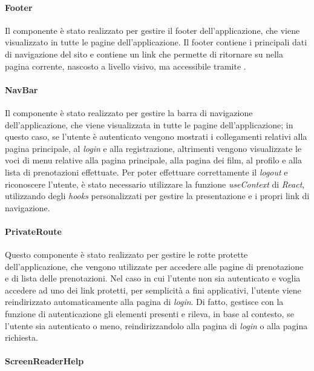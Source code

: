 \paragraph{Footer}\label{par:footer}

Il componente è stato realizzato per gestire il footer dell'applicazione, che viene visualizzato in tutte le pagine dell'applicazione.
Il footer contiene i principali dati di navigazione del sito e contiene un link che permette di ritornare su nella pagina corrente, nascosto a livello visivo, ma accessibile tramite .

\paragraph{NavBar}\label{par:navbar}

Il componente è stato realizzato per gestire la barra di navigazione dell'applicazione, che viene visualizzata in tutte le pagine dell'applicazione; in questo caso, se l'utente è autenticato vengono
mostrati i collegamenti relativi alla pagina principale, al \textit{login} e alla registrazione, altrimenti vengono visualizzate le voci di menu relative alla pagina principale, alla pagina dei film, al profilo e alla lista di prenotazioni effettuate.
Per poter effettuare correttamente il \textit{logout} e riconoscere l'utente, è stato necessario utilizzare la funzione \textit{useContext} di \textit{React}, utilizzando degli \textit{hooks} personalizzati per
gestire la presentazione e i propri link di navigazione.

\paragraph{PrivateRoute}\label{par:privateroute}

Questo componente è stato realizzato per gestire le rotte protette dell'applicazione, che vengono utilizzate per accedere alle pagine di prenotazione e di lista delle prenotazioni.
Nel caso in cui l'utente non sia autenticato e voglia accedere ad uno dei link protetti, per semplicità a fini applicativi,
l'utente viene reindirizzato automaticamente alla pagina di \textit{login}. Di fatto, gestisce con la funzione di autenticazione gli elementi presenti e rileva,
in base al contesto, se l'utente sia autenticato o meno, reindirizzandolo alla pagina di \textit{login} o alla pagina richiesta.

\paragraph{ScreenReaderHelp}\label{par:screenreaderhelp}


